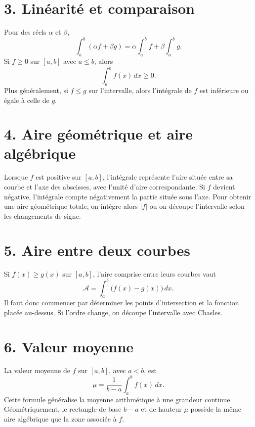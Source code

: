 \section{3. Linéarité et comparaison}
Pour des réels $\alpha$ et $\beta$,
\[
\int_a^b(\alpha f+\beta g)=\alpha\int_a^b f+\beta\int_a^b g.
\]
Si $f\geq0$ sur $[a,b]$ avec $a\leq b$, alors
\[
\int_a^b f(x)\,dx\geq0.
\]
Plus généralement, si $f\leq g$ sur l’intervalle, alors l’intégrale de $f$ est inférieure ou égale à celle de $g$.


\section{4. Aire géométrique et aire algébrique}
Lorsque $f$ est positive sur $[a,b]$, l’intégrale représente l’aire située entre sa courbe et l’axe des abscisses, avec l’unité d’aire correspondante. Si $f$ devient négative, l’intégrale compte négativement la partie située sous l’axe. Pour obtenir une aire géométrique totale, on intègre alors $|f|$ ou on découpe l’intervalle selon les changements de signe.

\section{5. Aire entre deux courbes}
Si $f(x)\geq g(x)$ sur $[a,b]$, l’aire comprise entre leurs courbes vaut
\[
\mathcal{A}=\int_a^b\bigl(f(x)-g(x)\bigr)\,dx.
\]
Il faut donc commencer par déterminer les points d’intersection et la fonction placée au-dessus. Si l’ordre change, on découpe l’intervalle avec Chasles.


\section{6. Valeur moyenne}
La valeur moyenne de $f$ sur $[a,b]$, avec $a<b$, est
\[
\mu=\frac1{b-a}\int_a^b f(x)\,dx.
\]
Cette formule généralise la moyenne arithmétique à une grandeur continue. Géométriquement, le rectangle de base $b-a$ et de hauteur $\mu$ possède la même aire algébrique que la zone associée à $f$.

